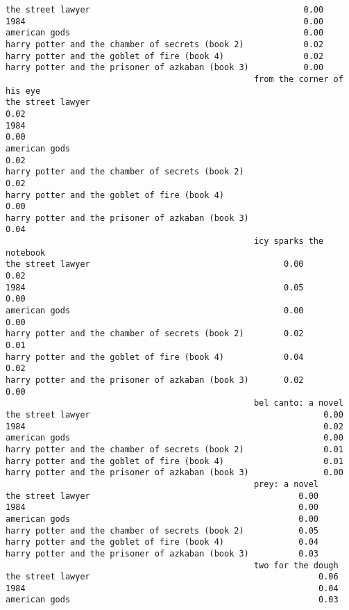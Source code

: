 \documentclass[
]{report}
\begin{document}
\begin{verbatim}
the street lawyer                                           0.00
1984                                                        0.00
american gods                                               0.00
harry potter and the chamber of secrets (book 2)            0.02
harry potter and the goblet of fire (book 4)                0.02
harry potter and the prisoner of azkaban (book 3)           0.00
                                                  from the corner of his eye
the street lawyer                                                       0.02
1984                                                                    0.00
american gods                                                           0.02
harry potter and the chamber of secrets (book 2)                        0.02
harry potter and the goblet of fire (book 4)                            0.00
harry potter and the prisoner of azkaban (book 3)                       0.04
                                                  icy sparks the notebook
the street lawyer                                       0.00         0.02
1984                                                    0.05         0.00
american gods                                           0.00         0.00
harry potter and the chamber of secrets (book 2)        0.02         0.01
harry potter and the goblet of fire (book 4)            0.04         0.02
harry potter and the prisoner of azkaban (book 3)       0.02         0.00
                                                  bel canto: a novel
the street lawyer                                               0.00
1984                                                            0.02
american gods                                                   0.00
harry potter and the chamber of secrets (book 2)                0.01
harry potter and the goblet of fire (book 4)                    0.01
harry potter and the prisoner of azkaban (book 3)               0.00
                                                  prey: a novel
the street lawyer                                          0.00
1984                                                       0.00
american gods                                              0.00
harry potter and the chamber of secrets (book 2)           0.05
harry potter and the goblet of fire (book 4)               0.04
harry potter and the prisoner of azkaban (book 3)          0.03
                                                  two for the dough
the street lawyer                                              0.06
1984                                                           0.04
american gods                                                  0.03

\end{verbatim}
\end{document}

